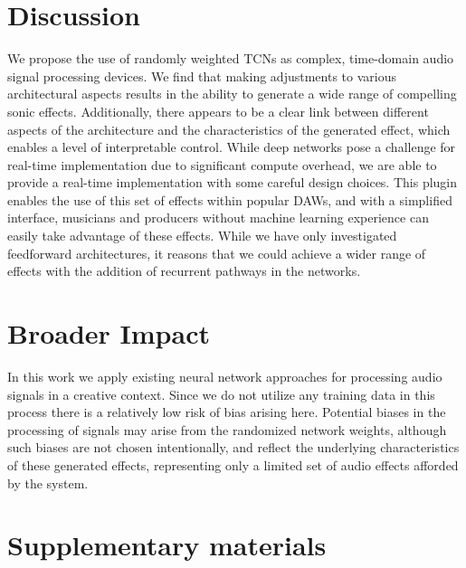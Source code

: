 \documentclass{article}
\begin{document}
\section{Discussion}

We propose the use of randomly weighted TCNs as complex, time-domain audio signal processing devices. 
We find that making adjustments to various architectural aspects results in the ability to generate a wide range of compelling sonic effects.
Additionally, there appears to be a clear link between different aspects of the architecture and the characteristics of the generated effect, 
which enables a level of interpretable control. 
While deep networks pose a challenge for real-time implementation due to significant compute overhead, 
we are able to provide a real-time implementation with some careful design choices. 
This plugin enables the use of this set of effects within popular DAWs, and 
with a simplified interface, musicians and producers without machine learning experience can easily take advantage of these effects.
While we have only investigated feedforward architectures, 
it reasons that we could achieve a wider range of effects with the addition of recurrent pathways in the networks.

\section*{Broader Impact}
In this work we apply existing neural network approaches for processing audio signals in a creative context.
Since we do not utilize any training data in this process there is a relatively low risk of bias arising here. 
Potential biases in the processing of signals may arise from the randomized network weights,
although such biases are not chosen intentionally, and reflect the underlying characteristics of these generated effects,
representing only a limited set of audio effects afforded by the system.

{}


\newpage
\section*{Supplementary materials}
\end{document}

